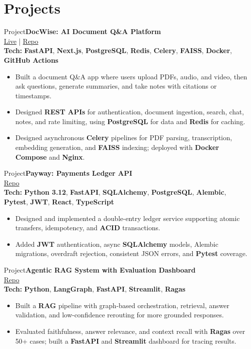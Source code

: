 \documentclass[a4paper,11pt]{article}
\newcommand{\entryspace}{\vspace{4pt}}
\newcommand{\projectmarker}{{\footnotesize\textcolor{subtext}{Project}}\enspace}
\newcommand{\linkline}[1]{{\footnotesize #1}}
\newcommand{\techline}[1]{{\footnotesize\textbf{Tech:} #1}}
\begin{document}
\section{Projects}
{\small
\projectmarker\textbf{DocWise: AI Document Q\&A Platform}\\
\linkline{\href{https://app.dheerajjoshi.dev}{\color{linkcolor}Live} | \href{https://github.com/dheeraj3587/DocWise}{\color{linkcolor}Repo}}\\
\techline{\textbf{FastAPI}, \textbf{Next.js}, \textbf{PostgreSQL}, \textbf{Redis}, \textbf{Celery}, \textbf{FAISS}, \textbf{Docker}, \textbf{GitHub Actions}}
\begin{itemize}
  \item Built a document Q\&A app where users upload PDFs, audio, and video, then ask questions, generate summaries, and take notes with citations or timestamps.
  \item Designed \textbf{REST APIs} for authentication, document ingestion, search, chat, notes, and rate limiting, using \textbf{PostgreSQL} for data and \textbf{Redis} for caching.
  \item Designed asynchronous \textbf{Celery} pipelines for PDF parsing, transcription, embedding generation, and \textbf{FAISS} indexing; deployed with \textbf{Docker Compose} and \textbf{Nginx}.
\end{itemize}

\entryspace

\projectmarker\textbf{Payway: Payments Ledger API}\\
\linkline{\href{https://github.com/dheeraj3587/Payway}{\color{linkcolor}Repo}}\\
\techline{\textbf{Python 3.12}, \textbf{FastAPI}, \textbf{SQLAlchemy}, \textbf{PostgreSQL}, \textbf{Alembic}, \textbf{Pytest}, \textbf{JWT}, \textbf{React}, \textbf{TypeScript}}
\begin{itemize}
  \item Designed and implemented a double-entry ledger service supporting atomic transfers, idempotency, and \textbf{ACID} transactions.
  \item Added \textbf{JWT} authentication, async \textbf{SQLAlchemy} models, Alembic migrations, overdraft rejection, consistent JSON errors, and \textbf{Pytest} coverage.
\end{itemize}

\entryspace

\projectmarker\textbf{Agentic RAG System with Evaluation Dashboard}\\
\linkline{\href{https://github.com/dheeraj3587/agentic-rag}{\color{linkcolor}Repo}}\\
\techline{\textbf{Python}, \textbf{LangGraph}, \textbf{FastAPI}, \textbf{Streamlit}, \textbf{Ragas}}
\begin{itemize}
  \item Built a \textbf{RAG} pipeline with graph-based orchestration, retrieval, answer validation, and low-confidence rerouting for more grounded responses.
  \item Evaluated faithfulness, answer relevance, and context recall with \textbf{Ragas} over 50+ cases; built a \textbf{FastAPI} and \textbf{Streamlit} dashboard for tracing results.
\end{itemize}
}
\end{document}
